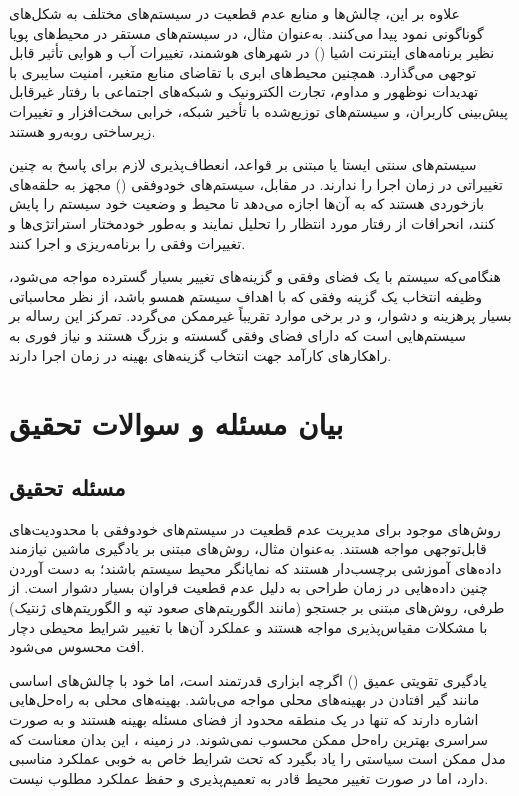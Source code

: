 \documentclass[oneside,openany,phd]{TMU-Thesis}
\begin{document}
علاوه بر این، چالش‌ها و منابع عدم قطعیت در سیستم‌های مختلف به شکل‌های گوناگونی نمود پیدا می‌کنند. به‌عنوان مثال، در سیستم‌های مستقر در محیط‌های پویا نظیر برنامه‌های اینترنت اشیا () در شهرهای هوشمند، تغییرات آب و هوایی تأثیر قابل توجهی می‌گذارد. همچنین محیط‌های ابری با تقاضای منابع متغیر، امنیت سایبری با تهدیدات نوظهور و مداوم، تجارت الکترونیک و شبکه‌های اجتماعی با رفتار غیرقابل پیش‌بینی کاربران، و سیستم‌های توزیع‌شده با تأخیر شبکه، خرابی سخت‌افزار و تغییرات زیرساختی روبه‌رو هستند.

سیستم‌های سنتی ایستا یا مبتنی بر قواعد، انعطاف‌پذیری لازم برای پاسخ به چنین تغییراتی در زمان اجرا را ندارند. در مقابل، سیستم‌های خودوفقی () مجهز به حلقه‌های بازخوردی هستند که به آن‌ها اجازه می‌دهد تا محیط و وضعیت خود سیستم را پایش کنند، انحرافات از رفتار مورد انتظار را تحلیل نمایند و به‌طور خودمختار استراتژی‌ها و تغییرات وفقی را برنامه‌ریزی و اجرا کنند.

هنگامی‌که سیستم با یک فضای وفقی و گزینه‌های تغییر بسیار گسترده مواجه می‌شود، وظیفه انتخاب یک گزینه وفقی که با اهداف سیستم همسو باشد، از نظر محاسباتی بسیار پرهزینه و دشوار، و در برخی موارد تقریباً غیرممکن می‌گردد. تمرکز این رساله بر سیستم‌هایی است که دارای فضای وفقی گسسته و بزرگ هستند و نیاز فوری به راهکارهای کارآمد جهت انتخاب گزینه‌های بهینه در زمان اجرا دارند.

\section{بیان مسئله و سوالات تحقیق}

\subsection{مسئله تحقیق}

روش‌های موجود برای مدیریت عدم قطعیت در سیستم‌های خودوفقی با محدودیت‌های قابل‌توجهی مواجه هستند. به‌عنوان مثال، روش‌های مبتنی بر یادگیری ماشین نیازمند داده‌های آموزشی برچسب‌دار هستند که نمایانگر محیط سیستم باشند؛ به دست آوردن چنین داده‌هایی در زمان طراحی به دلیل عدم قطعیت فراوان بسیار دشوار است. از طرفی، روش‌های مبتنی بر جستجو (مانند الگوریتم‌های صعود تپه و الگوریتم‌های ژنتیک) با مشکلات مقیاس‌پذیری مواجه هستند و عملکرد آن‌ها با تغییر شرایط محیطی دچار افت محسوس می‌شود.

یادگیری تقویتی عمیق () اگرچه ابزاری قدرتمند است، اما خود با چالش‌های اساسی مانند گیر افتادن در بهینه‌های محلی مواجه می‌باشد. بهینه‌های محلی به راه‌حل‌هایی اشاره دارند که تنها در یک منطقه محدود از فضای مسئله بهینه هستند و به صورت سراسری بهترین راه‌حل ممکن محسوب نمی‌شوند. در زمینه ، این بدان معناست که مدل ممکن است سیاستی را یاد بگیرد که تحت شرایط خاص به خوبی عملکرد مناسبی دارد، اما در صورت تغییر محیط قادر به تعمیم‌پذیری و حفظ عملکرد مطلوب نیست.
\end{document}
